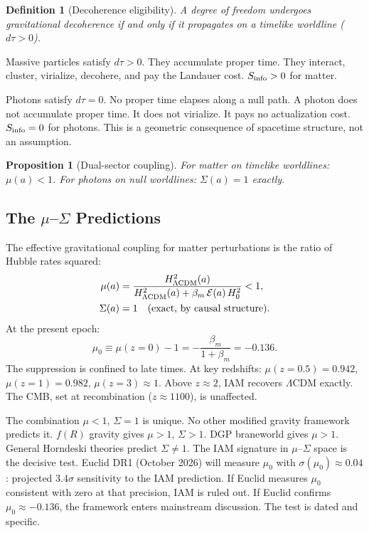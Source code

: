 \documentclass[12pt,a4paper]{article}
\newtheorem{proposition}{Proposition}
\newtheorem{definition}{Definition}
\begin{document}
\begin{definition}[Decoherence eligibility]
A degree of freedom undergoes gravitational decoherence if and only if it
propagates on a timelike worldline ($d\tau > 0$).
\end{definition}

Massive particles satisfy $d\tau > 0$. They accumulate proper time. They
interact, cluster, virialize, decohere, and pay the Landauer cost. $S_{\rm info}
> 0$ for matter.

Photons satisfy $d\tau = 0$. No proper time elapses along a null path. A photon
does not accumulate proper time. It does not virialize. It pays no actualization
cost. $S_{\rm info} = 0$ for photons. This is a geometric consequence of
spacetime structure, not an assumption.

\begin{proposition}[Dual-sector coupling]
For matter on timelike worldlines: $\mu(a) < 1$.
For photons on null worldlines: $\Sigma(a) = 1$ exactly.
\end{proposition}

\subsection{The $\mu$--$\Sigma$ Predictions}

The effective gravitational coupling for matter perturbations is the ratio of
Hubble rates squared:
\begin{align}
\mu(a) &= \frac{H^2_{\Lambda{\rm CDM}}(a)}{H^2_{\Lambda{\rm CDM}}(a)
+ \beta_m\,\mathcal{E}(a)\,H_0^2} < 1,\label{eq:mu}\\
\Sigma(a) &= 1 \quad\text{(exact, by causal structure).}\label{eq:sigma}
\end{align}
At the present epoch:
\begin{equation}
\mu_0 \equiv \mu(z{=}0) - 1 = -\frac{\beta_m}{1+\beta_m} = -0.136.
\end{equation}
The suppression is confined to late times. At key redshifts:
$\mu(z{=}0.5) = 0.942$, $\mu(z{=}1) = 0.982$, $\mu(z{=}3) \approx 1$.
Above $z \approx 2$, IAM recovers $\Lambda$CDM exactly. The CMB, set at
recombination ($z \approx 1100$), is unaffected.

The combination $\mu < 1$, $\Sigma = 1$ is unique. No other modified gravity
framework predicts it. $f(R)$ gravity gives $\mu > 1$, $\Sigma > 1$. DGP
braneworld gives $\mu > 1$. General Horndeski theories predict $\Sigma \neq 1$.
The IAM signature in $\mu$--$\Sigma$ space is the decisive test. Euclid DR1
(October 2026) will measure $\mu_0$ with $\sigma(\mu_0) \approx 0.04$:
projected $3.4\sigma$ sensitivity to the IAM prediction. If Euclid measures
$\mu_0$ consistent with zero at that precision, IAM is ruled out. If Euclid
confirms $\mu_0 \approx -0.136$, the framework enters mainstream discussion.
The test is dated and specific.
\end{document}
